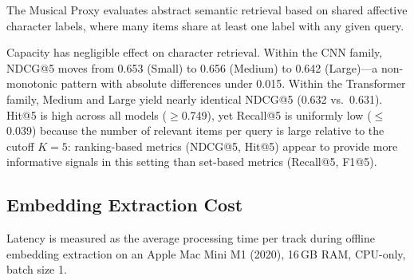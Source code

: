 \documentclass[sigconf]{acmart}
\begin{document}
The Musical Proxy evaluates abstract semantic retrieval based on shared affective character labels, where many items share at least one label with any given query.

\begin{table}[!htbp]
\centering
\caption{Primary Musical Proxy Results (Character Retrieval). Metrics reported are corpus-level mean values at rank 5.}
\label{tab:musical_results}
\end{table}

Capacity has negligible effect on character retrieval. Within the CNN family, NDCG@5 moves from 0.653 (Small) to 0.656 (Medium) to 0.642 (Large)---a non-monotonic pattern with absolute differences under 0.015. Within the Transformer family, Medium and Large yield nearly identical NDCG@5 (0.632 vs.\ 0.631). Hit@5 is high across all models ($\geq$0.749), yet Recall@5 is uniformly low ($\leq$0.039) because the number of relevant items per query is large relative to the cutoff $K{=}5$: ranking-based metrics (NDCG@5, Hit@5) appear to provide more informative signals in this setting than set-based metrics (Recall@5, F1@5).

\subsection{Embedding Extraction Cost}

Latency is measured as the average processing time per track during offline embedding extraction on an Apple Mac Mini M1 (2020), 16\,GB RAM, CPU-only, batch size 1.
\end{document}
